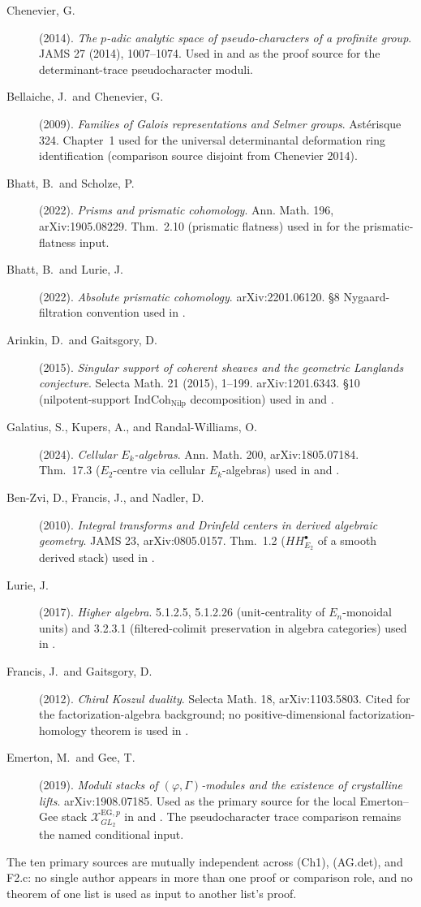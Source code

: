 \begin{description}
\item[Chenevier, G.] (2014). \emph{The \(p\)-adic analytic space of
pseudo-characters of a profinite group}. JAMS 27 (2014),
1007--1074. Used in
 and
 as the proof source for
the determinant-trace pseudocharacter moduli.
\item[Bellaiche, J.\ and Chenevier, G.] (2009). \emph{Families of
Galois representations and Selmer groups}. Ast\'erisque 324.
Chapter~1 used for the universal determinantal deformation ring
identification (comparison source disjoint from Chenevier 2014).
\item[Bhatt, B.\ and Scholze, P.] (2022). \emph{Prisms and prismatic
cohomology}. Ann. Math. 196, arXiv:1905.08229. Thm.~2.10
(prismatic flatness) used in
 for the prismatic-flatness
input.
\item[Bhatt, B.\ and Lurie, J.] (2022). \emph{Absolute prismatic
cohomology}. arXiv:2201.06120. \S8 Nygaard-filtration convention
used in .
\item[Arinkin, D.\ and Gaitsgory, D.] (2015). \emph{Singular support
of coherent sheaves and the geometric Langlands conjecture}. Selecta
Math. 21 (2015), 1--199. arXiv:1201.6343. \S10 (nilpotent-support
\(\mathrm{IndCoh}_{\mathrm{Nilp}}\) decomposition) used in
 and
.
\item[Galatius, S., Kupers, A., and Randal-Williams, O.] (2024).
\emph{Cellular \(E_{k}\)-algebras}. Ann. Math. 200, arXiv:1805.07184.
Thm.~17.3 (\(E_{2}\)-centre via cellular \(E_{k}\)-algebras) used in
 and
.
\item[Ben-Zvi, D., Francis, J., and Nadler, D.] (2010). \emph{Integral
transforms and Drinfeld centers in derived algebraic geometry}.
JAMS 23, arXiv:0805.0157. Thm.~1.2 (\(HH^{\bullet}_{E_{2}}\) of a
smooth derived stack) used in .
\item[Lurie, J.] (2017). \emph{Higher algebra}. 5.1.2.5, 5.1.2.26
(unit-centrality of \(E_{n}\)-monoidal units) and 3.2.3.1
(filtered-colimit preservation in algebra categories) used in
.
\item[Francis, J.\ and Gaitsgory, D.] (2012). \emph{Chiral
Koszul duality}. Selecta Math. 18, arXiv:1103.5803. Cited for the
factorization-algebra background; no positive-dimensional
factorization-homology theorem is used in
.
\item[Emerton, M.\ and Gee, T.] (2019). \emph{Moduli stacks of
\((\varphi,\Gamma)\)-modules and the existence of crystalline lifts}.
arXiv:1908.07185. Used as the
primary source for the local Emerton--Gee stack
\(\mathcal{X}^{\mathrm{EG},p}_{GL_{2}}\) in
 and
.  The
pseudocharacter trace comparison remains the named conditional
input.
\end{description}

The ten primary sources are mutually independent across (Ch1),
(AG.det), and F2.c: no single author appears in more than one proof
or comparison role, and
no theorem of one list is used as input to another list's
proof.
